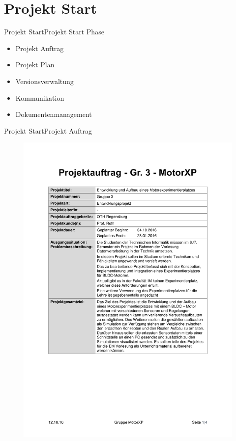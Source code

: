 \section{Projekt Start}
\begin{frame}{Projekt Start}{Projekt Start Phase}
  \begin{itemize}
    \item Projekt Auftrag
    \item Projekt Plan
    \item Versionsverwaltung
    \item Kommunikation
    \item Dokumentenmanagement
  \end{itemize}
\end{frame}
\begin{frame}{Projekt Start}{Projekt Auftrag}
	\begin{figure}[htbp]
 		\centering
 			\includegraphics[scale=0.3]{../projectdefinition/Appendix/Projektauftrag_Gruppe3_MotorXP.pdf}
	\end{figure}
\end{frame}
